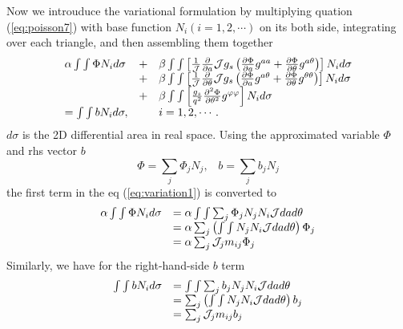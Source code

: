\documentclass{report}
\newcommand{\ff}[2]{\frac{#1}{#2}}
\newcommand{\pp}[2]{\frac{\partial{#1}}{\partial{#2}}}
\newcommand{\psp}[2]{\frac{\partial^2{#1}}{\partial{#2}^2}}
\begin{document}
Now we introuduce the variational formulation by
multiplying quation (\ref{eq:poisson7}) with base function $N_i (i=1, 2, \cdots)$ on its both side, 
integrating over each triangle, and then assembling them together
\begin{equation}
\label{eq:variation1}
\begin{array}{lll}
\alpha \int\int \Phi N_i d\sigma
& + & \beta \int\int \left[
      \ff{1}{\cal J} \pp{}{a} {\cal J} g_s \left( 
           \pp{\Phi}{a} g^{a a} + \pp{\Phi}{\theta} g^{a \theta}
                                           \right)
                   \right] N_i d\sigma
\\
& + & \beta \int\int \left[
      \ff{1}{\cal J} \pp{}{\theta} {\cal J} g_s \left( 
           \pp{\Phi}{a} g^{a \theta} + \pp{\Phi}{\theta} g^{\theta \theta}
                                                \right)
                   \right] N_i d\sigma
\\
& + & \beta \int\int \left[
      \ff{g_s}{q^2} \psp{\Phi}{\theta} g^{\varphi \varphi}
                   \right] N_i d\sigma
\\
= \int\int b N_i d\sigma, & & i=1, 2, \cdots.
\end{array}
\end{equation}
$d\sigma$ is the 2D differential area in real space.
Using the approximated variable $\Phi$ and rhs vector $b$
$$
\Phi = \sum_j \Phi_j N_j, \;\;\;
b = \sum_j b_j N_j
$$
the first term in the eq (\ref{eq:variation1}) is converted to
\begin{equation}
\label{eq:variation2}
\begin{array}{ll}
\alpha \int\int \Phi N_i d\sigma
& = \alpha \int\int \sum_j \Phi_j N_j N_i {\cal J} da d\theta
\\
& = \alpha \sum_j \left(\int\int N_j N_i {\cal J} dad\theta\right) \Phi_j
\\
& = \alpha \sum_j {\cal J}_j m_{ij} \Phi_j
\end{array}
\end{equation}
Similarly, we have for the right-hand-side $b$ term
\begin{equation}
\label{eq:variation3}
\begin{array}{ll}
\int\int b N_i d\sigma
& = \int\int \sum_j b_j N_j N_i {\cal J} dad\theta
\\
& = \sum_j \left(\int\int N_j N_i {\cal J} da d\theta\right) b_j
\\
& = \sum_j {\cal J}_j m_{ij} b_j
\end{array}
\end{equation}
\end{document}
